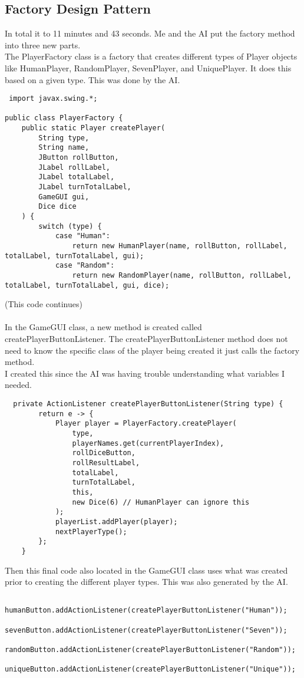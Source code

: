 \documentclass[a4paper,11pt]{article}
\begin{document}
\subsection{Factory Design Pattern}
 In total it to 11 minutes and 43 seconds. Me and the AI put the factory method into three new parts.\\
 The PlayerFactory class is a factory that creates different types of Player objects like HumanPlayer, RandomPlayer, SevenPlayer, and UniquePlayer. It does this based on a given type. This was done by the AI.
 \begin{lstlisting}
 import javax.swing.*;

public class PlayerFactory {
    public static Player createPlayer(
        String type,
        String name,
        JButton rollButton,
        JLabel rollLabel,
        JLabel totalLabel,
        JLabel turnTotalLabel,
        GameGUI gui,
        Dice dice
    ) {
        switch (type) {
            case "Human":
                return new HumanPlayer(name, rollButton, rollLabel, totalLabel, turnTotalLabel, gui);
            case "Random":
                return new RandomPlayer(name, rollButton, rollLabel, totalLabel, turnTotalLabel, gui, dice);
\end{lstlisting}
(This code continues)\\\\
 In the GameGUI class, a new method is created called createPlayerButtonListener. The createPlayerButtonListener method does not need to know the specific class of the player being created it just calls the factory method. \\
 I created this since the AI was having trouble understanding what variables I needed. 
\begin{lstlisting}
  private ActionListener createPlayerButtonListener(String type) {
        return e -> {
            Player player = PlayerFactory.createPlayer(
                type,
                playerNames.get(currentPlayerIndex),
                rollDiceButton,
                rollResultLabel,
                totalLabel,
                turnTotalLabel,
                this,
                new Dice(6) // HumanPlayer can ignore this
            );
            playerList.addPlayer(player);
            nextPlayerType();
        };
    }
\end{lstlisting}
Then this final code also located in the GameGUI class uses what was created prior to creating the different player types. This was also generated by the AI.
\begin{lstlisting}  
        humanButton.addActionListener(createPlayerButtonListener("Human"));
        sevenButton.addActionListener(createPlayerButtonListener("Seven"));
        randomButton.addActionListener(createPlayerButtonListener("Random"));
        uniqueButton.addActionListener(createPlayerButtonListener("Unique"));
        
\end{lstlisting}
\end{document}
